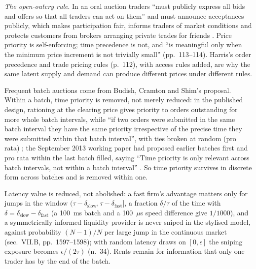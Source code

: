 \begin{qfmechanism}
\emph{The open-outcry rule}. In an oral auction traders ``must publicly express all bids and offers so that all traders can act on them'' and must announce acceptances publicly, which makes participation fair, informs traders of market conditions and protects customers from brokers arranging private trades for friends \citep[chap.~6, sec.~6.1, p.~113]{alpha-harris}. Price priority is self-enforcing; time precedence is not, and ``is meaningful only when the minimum price increment is not trivially small'' (pp.~113--114). Harris's order precedence and trade pricing rules (p.~112), with access rules added, are why the same latent supply and demand can produce different prices under different rules.

 Frequent batch auctions come from Budish, Cramton and Shim's proposal. Within a batch, time priority is removed, not merely reduced: in the published design, rationing at the clearing price gives priority to orders outstanding for more whole batch intervals, while ``if two orders were submitted in the same batch interval they have the same priority irrespective of the precise time they were submitted within that batch interval'', with ties broken at random (pro rata) \citep[sec.~VII.A, p.~1596]{wide-budish-cramton-shim}; the September 2013 working paper had proposed earlier batches first and pro rata within the last batch filled, saying ``Time priority is only relevant across batch intervals, not within a batch interval'' \citep[n.~33, printed p.~42]{bcs-nber-2013}. So time priority survives in discrete form across batches and is removed within one.

Latency value is reduced, not abolished: a fast firm's advantage matters only for jumps in the window $(\tau-\delta_{\text{slow}},\tau-\delta_{\text{fast}}]$, a fraction $\delta/\tau$ of the time with $\delta=\delta_{\text{slow}}-\delta_{\text{fast}}$ (a 100~ms batch and a 100~$\mu$s speed difference give $1/1000$), and a symmetrically informed liquidity provider is never sniped in the stylised model, against probability $(N-1)/N$ per large jump in the continuous market (sec.~VII.B, pp.~1597--1598); with random latency draws on $[0,\epsilon]$ the sniping exposure becomes $\epsilon/(2\tau)$ (n.~34). Rents remain for information that only one trader has by the end of the batch.


\end{qfmechanism}

